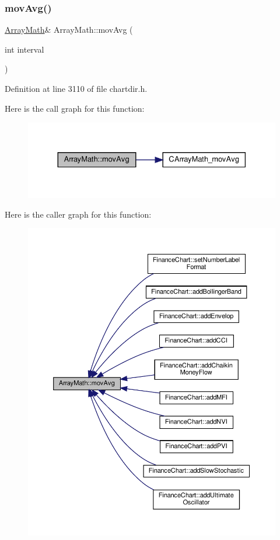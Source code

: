 \subsubsection{\texorpdfstring{mov\+Avg()}{movAvg()}}
{\footnotesize\ttfamily \hyperlink{class_array_math}{Array\+Math}\& Array\+Math\+::mov\+Avg (\begin{DoxyParamCaption}\item[{int}]{interval }\end{DoxyParamCaption})\hspace{0.3cm}{\ttfamily [inline]}}



Definition at line 3110 of file chartdir.\+h.

Here is the call graph for this function\+:
\nopagebreak
\begin{figure}[H]
\begin{center}
\leavevmode
\includegraphics[width=330pt]{class_array_math_abaaac1009dda4a6124ecd2182354dc39_cgraph}
\end{center}
\end{figure}
Here is the caller graph for this function\+:
\nopagebreak
\begin{figure}[H]
\begin{center}
\leavevmode
\includegraphics[width=350pt]{class_array_math_abaaac1009dda4a6124ecd2182354dc39_icgraph}
\end{center}
\end{figure}
